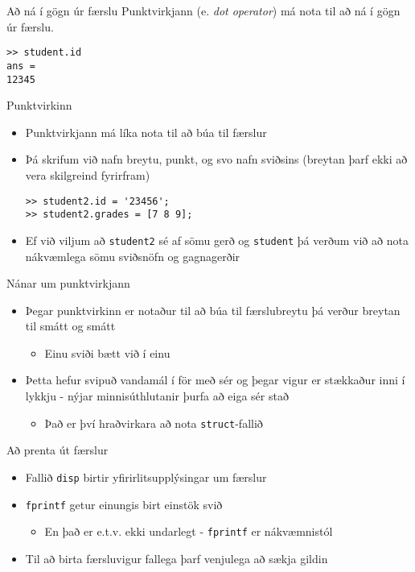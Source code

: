 \documentclass[handout]{beamer}
\begin{document}
\begin{frame}[fragile]{Að ná í gögn úr færslu}
Punktvirkjann (e. \emph{dot operator}) má nota til að ná í gögn úr færslu.
\begin{verbatim}
>> student.id
ans =
12345
\end{verbatim}
\end{frame}

\begin{frame}[fragile]{Punktvirkinn}
\begin{itemize}
 \item Punktvirkjann má líka nota til að búa til færslur
 \item Þá skrifum við nafn breytu, punkt, og svo nafn sviðsins (breytan þarf ekki að vera skilgreind fyrirfram)
\begin{verbatim}
>> student2.id = '23456';
>> student2.grades = [7 8 9];
\end{verbatim}
 \item Ef við viljum að \texttt{student2} sé af sömu gerð og \texttt{student} þá verðum við að nota nákvæmlega sömu sviðsnöfn og gagnagerðir
\end{itemize}
\end{frame}

\begin{frame}{Nánar um punktvirkjann}
\begin{itemize}
 \item Þegar punktvirkinn er notaður til að búa til færslubreytu þá verður breytan til smátt og smátt
 \begin{itemize}
  \item Einu sviði bætt við í einu
 \end{itemize}
 \item Þetta hefur svipuð vandamál í för með sér og þegar vigur er stækkaður inni í lykkju - nýjar minnisúthlutanir þurfa að eiga sér stað
 \begin{itemize}
  \item Það er því hraðvirkara að nota \texttt{struct}-fallið
 \end{itemize}
\end{itemize}
\end{frame}

\begin{frame}{Að prenta út færslur}
    \begin{itemize}
        \item Fallið \texttt{disp} birtir yfirirlitsupplýsingar um færslur
        \item \texttt{fprintf} getur einungis birt einstök svið
        \begin{itemize}
        \item En það er e.t.v. ekki undarlegt - \texttt{fprintf} er nákvæmnistól
        \end{itemize}
        \item Til að birta færsluvigur fallega þarf venjulega að sækja gildin
    \end{itemize}
\end{frame}
\end{document}

